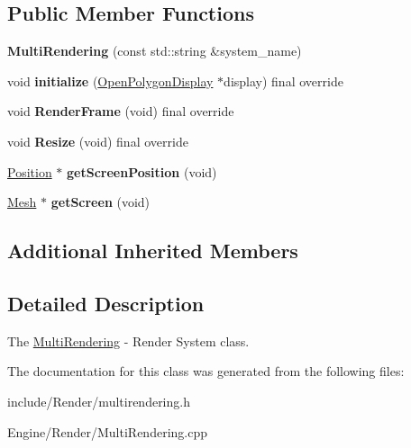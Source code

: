 \subsection*{Public Member Functions}
\begin{DoxyCompactItemize}
\item 
\hypertarget{classEngine_1_1MultiRendering_a2424052bf0bcf131bb1105d00ae160ca}{}{\bfseries Multi\+Rendering} (const std\+::string \&system\+\_\+name)\label{classEngine_1_1MultiRendering_a2424052bf0bcf131bb1105d00ae160ca}

\item 
\hypertarget{classEngine_1_1MultiRendering_a0f36b2037a8d739d0317c2428ef8680d}{}void {\bfseries initialize} (\hyperlink{classEngine_1_1OpenPolygonDisplay}{Open\+Polygon\+Display} $\ast$display) final override\label{classEngine_1_1MultiRendering_a0f36b2037a8d739d0317c2428ef8680d}

\item 
\hypertarget{classEngine_1_1MultiRendering_a664270e53edf1012f5def567222dbd2d}{}void {\bfseries Render\+Frame} (void) final override\label{classEngine_1_1MultiRendering_a664270e53edf1012f5def567222dbd2d}

\item 
\hypertarget{classEngine_1_1MultiRendering_a417089c3206f1c2caa17f818a178496c}{}void {\bfseries Resize} (void) final override\label{classEngine_1_1MultiRendering_a417089c3206f1c2caa17f818a178496c}

\item 
\hypertarget{classEngine_1_1MultiRendering_a8bb0c88c459ae5b3c1e0db8b61e34e9e}{}\hyperlink{classEngine_1_1Position}{Position} $\ast$ {\bfseries get\+Screen\+Position} (void)\label{classEngine_1_1MultiRendering_a8bb0c88c459ae5b3c1e0db8b61e34e9e}

\item 
\hypertarget{classEngine_1_1MultiRendering_a0df4ce83eb604a195ac4cdfe7ac85051}{}\hyperlink{classEngine_1_1Mesh}{Mesh} $\ast$ {\bfseries get\+Screen} (void)\label{classEngine_1_1MultiRendering_a0df4ce83eb604a195ac4cdfe7ac85051}

\end{DoxyCompactItemize}
\subsection*{Additional Inherited Members}


\subsection{Detailed Description}
The \hyperlink{classEngine_1_1MultiRendering}{Multi\+Rendering} -\/ Render System class. 

The documentation for this class was generated from the following files\+:\begin{DoxyCompactItemize}
\item 
include/\+Render/multirendering.\+h\item 
Engine/\+Render/Multi\+Rendering.\+cpp\end{DoxyCompactItemize}
